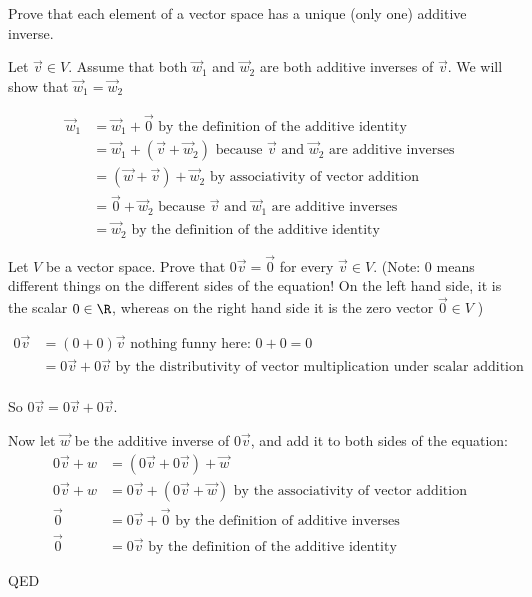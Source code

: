 \documentclass{ximera}
\begin{document}
Prove that each element of a vector space has a unique (only one) additive inverse.
\begin{free-response}
  Let $\vec{v} \in V$.  Assume that both $\vec{w}_1$ and $\vec{w}_2$ are both additive inverses of $\vec{v}$.  We will show that $\vec{w}_1=\vec{w}_2$
  
  \begin{align*}
    \vec{w}_1&= \vec{w}_1+\vec{0} \text{ by the definition of the additive identity}\\
    &= \vec{w}_1+\left(\vec{v}+ \vec{w}_2\right) \text{ because $\vec{v}$ and $\vec{w}_2$ are additive inverses}\\
    &=\left( \vec{w}+\vec{v}\right)+\vec{w}_2 \text{ by associativity of vector addition}\\
    &= \vec{0}+\vec{w}_2 \text{ because $\vec{v}$ and $\vec{w}_1$ are additive inverses}\\
    &= \vec{w}_2 \text{ by the definition of the additive identity}
  \end{align*}
\end{free-response}
	

Let $V$ be a vector space. Prove that $0\vec{v} = \vec{0}$ for every $\vec{v} \in V$. (Note: $0$ means different things on the different sides of the equation!  On
the left hand side, it is the scalar $0\in\R$, whereas on the right hand side it is the zero vector $\vec{0} \in V$ )

\begin{free-response}
  
  \begin{align*}
    0\vec{v} &= (0+0)\vec{v} \text{ nothing funny here:  $0+0=0$}\\
    &=0\vec{v}+0\vec{v} \text{ by the distributivity of vector multiplication under scalar addition}\\
  \end{align*}
  
  So $0\vec{v} = 0\vec{v}+0\vec{v}$.
  
  Now let $\vec{w}$ be the additive inverse of $0\vec{v}$, and add it to both sides of the equation:
  \begin{align*}
    0\vec{v}+w &= \left(0\vec{v}+0\vec{v} \right) + \vec{w}\\
    0\vec{v}+w & = 0\vec{v}+\left( 0\vec{v} +\vec{w}\right) \text{ by the associativity of vector addition}\\
    \vec{0} &= 0\vec{v}+\vec{0} \text{ by the definition of additive inverses}\\
    \vec{0}&= 0\vec{v} \text{ by the definition of the additive identity}
  \end{align*}
  
  QED
\end{free-response}
\end{document}
